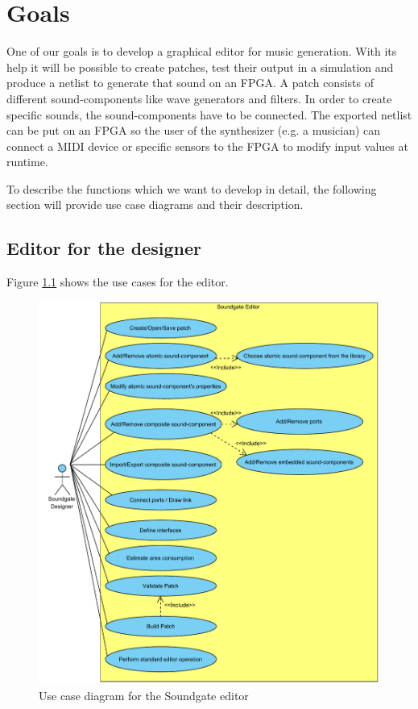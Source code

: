 \chapter{Goals}
\label{chapter:Goals}
One of our goals is to develop a graphical editor for music generation. With its help it will be possible to create patches, test their output in a simulation and produce a netlist to generate that sound on an \ac{FPGA}. A patch consists of different sound-components like wave generators and filters. In order to create specific sounds, the sound-components have to be connected. The exported netlist can be put on an \ac{FPGA} so the user of the synthesizer (e.g. a musician) can connect a MIDI device or specific sensors to the \ac{FPGA} to modify input values at runtime. %

To describe the functions which we want to develop in detail, the following section will provide use case diagrams and their description.

\section{Editor for the designer}
\label{editor}
Figure \ref{fig:Soundgate_Designer} shows the use cases for the editor.

	\begin{figure}[!h]
		\centering
			\includegraphics[width=1\textwidth]{images/Soundgate_Designer.pdf}
		\caption{Use case diagram for the Soundgate editor}
		\label{fig:Soundgate_Designer}
	\end{figure}

